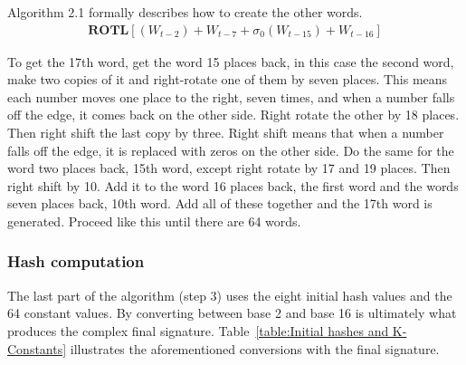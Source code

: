         
        Algorithm 2.1 formally describes how to create the other words. 
        \begin{gather}
             \textbf{ROTL} [(W_{t-2}) + W_{t-7} + \sigma_0(W_{t-15}) + W_{t-16}]
        \end{gather}
        
        
        To get the 17th word, get the word 15 places back, in this case the second word, make two copies of it and right-rotate one of them by seven places. This means each number moves one place to the right, seven times, and when a number falls off the edge, it comes back on the other side. Right rotate the other by 18 places. Then right shift the last copy by three. Right shift means that when a number falls off the edge, it is replaced with zeros on the other side. Do the same for the word two places back, 15th word, except right rotate by 17 and 19 places. Then right shift by 10. Add it to the word 16 places back, the first word and the words seven places back, 10th word. Add all of these together and the 17th word is generated. Proceed like this until there are 64 words. 
        
        \subsubsection{ Hash computation}
        
        The last part of the algorithm (step 3) uses the eight initial hash values and the 64 constant values. By converting between base 2 and base 16 is ultimately what produces the complex final signature. Table~\ref{table:Initial hashes and K-Constants} illustrates the aforementioned conversions with the final signature.
        
        
            

